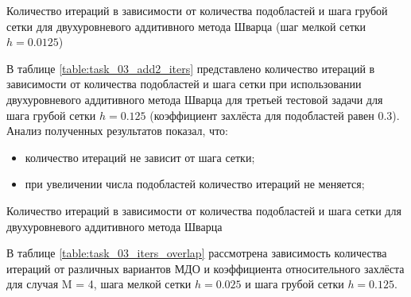 \documentclass[a4paper]{article}
\begin{document}
\newpage

\begin{table}[h]
\caption{Количество итераций в зависимости от количества подобластей и шага грубой сетки для двухуровневого аддитивного метода Шварца (шаг мелкой сетки $h = 0.0125$)}
\label{table:task_03_add2_coarse}
\end{table}

В таблице \ref{table:task_03_add2_iters} представлено количество итераций в зависимости от количества подобластей и шага сетки при использовании двухуровневого аддитивного метода Шварца для третьей тестовой задачи для шага грубой сетки $h = 0.125$ (коэффициент захлёста для подобластей равен 0.3). Анализ полученных результатов показал, что:
\begin{itemize}
\item количество итераций не зависит от шага сетки;
\item при увеличении числа подобластей количество итераций не меняется;
\end{itemize}

\begin{table}[h]
\caption{Количество итераций в зависимости от количества подобластей и шага сетки для двухуровневого аддитивного метода Шварца}
\label{table:task_03_add2_iters}
\end{table}

В таблице \ref{table:task_03_iters_overlap} рассмотрена зависимость количества итераций от различных вариантов МДО и коэффициента относительного захлёста для случая M = 4, шага мелкой сетки $h = 0.025$ и шага грубой сетки $h = 0.125$. 
\end{document}
